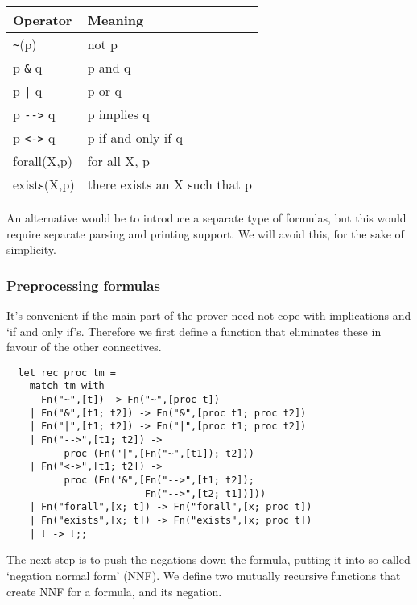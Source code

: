 \begin{center}
\begin{tabular}{|l|l|}
\hline
Operator   & Meaning                             \\
\hline
{\verb+~+}(p)    & not p                         \\
p {\verb+&+} q   & p and q                       \\
p {\verb+|+} q   & p or q                        \\
p {\verb+-->+} q & p implies q                   \\
p {\verb+<->+} q & p if and only if q            \\
forall(X,p)      & for all X, p                  \\
exists(X,p)      & there exists an X such that p \\
\hline
\end{tabular}
\end{center}

An alternative would be to introduce a separate type of formulas, but this
would require separate parsing and printing support. We will avoid this, for
the sake of simplicity.

\subsubsection*{Preprocessing formulas}

It's convenient if the main part of the prover need not cope with implications
and `if and only if's. Therefore we first define a function that eliminates
these in favour of the other connectives.

\begin{boxed}\begin{lstlisting}
  let rec proc tm =
    match tm with
      Fn("~",[t]) -> Fn("~",[proc t])
    | Fn("&",[t1; t2]) -> Fn("&",[proc t1; proc t2])
    | Fn("|",[t1; t2]) -> Fn("|",[proc t1; proc t2])
    | Fn("-->",[t1; t2]) ->
          proc (Fn("|",[Fn("~",[t1]); t2]))
    | Fn("<->",[t1; t2]) ->
          proc (Fn("&",[Fn("-->",[t1; t2]);
                        Fn("-->",[t2; t1])]))
    | Fn("forall",[x; t]) -> Fn("forall",[x; proc t])
    | Fn("exists",[x; t]) -> Fn("exists",[x; proc t])
    | t -> t;;
\end{lstlisting}\end{boxed}

The next step is to push the negations down the formula, putting it into
so-called `negation normal form' (NNF). We define two mutually recursive
functions that create NNF for a formula, and
its negation.

